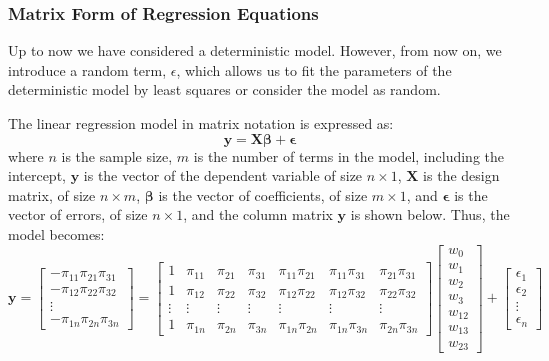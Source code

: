 \documentclass[
	11pt, %
	fleqn, %
	a4paper, %
]{LegrandOrangeBook}
\begin{document}
\subsubsection{Matrix Form of Regression Equations}
Up to now we have considered a deterministic model. However, from now on, we introduce a random term, $\epsilon$, which allows us to fit the parameters of the deterministic model by least squares or consider the model as random.

The linear regression model in matrix notation is expressed as:
\begin{equation}
\mathbf{y} = \mathbf{X}\boldsymbol{\beta} + \boldsymbol{\epsilon}
\label{eq:matrixregression}
\end{equation}
where $n$ is the sample size, $m$ is the number of terms in the model, including the intercept, $\mathbf{y}$ is the vector of the dependent variable of size $n \times 1$, $\mathbf{X}$ is the design matrix, of size $n \times m$, $\boldsymbol{\beta}$ is the vector of coefficients, of size $m \times 1$, and $\boldsymbol{\epsilon}$ is the vector of errors, of size $n \times 1$, and the column matrix $\mathbf{y}$ is shown below.
Thus, the model becomes:
\begin{equation}
\mathbf{y} = \begin{bmatrix}
-\pi_{11}\pi_{21}\pi_{31} \\
-\pi_{12}\pi_{22}\pi_{32} \\
\vdots \\
-\pi_{1n}\pi_{2n}\pi_{3n}
\end{bmatrix} =
\begin{bmatrix}
1 & \pi_{11} & \pi_{21} & \pi_{31} & \pi_{11}\pi_{21} & \pi_{11}\pi_{31} & \pi_{21}\pi_{31} \\
1 & \pi_{12} & \pi_{22} & \pi_{32} & \pi_{12}\pi_{22} & \pi_{12}\pi_{32} & \pi_{22}\pi_{32} \\
\vdots & \vdots & \vdots & \vdots & \vdots & \vdots & \vdots \\
1 & \pi_{1n} & \pi_{2n} & \pi_{3n} & \pi_{1n}\pi_{2n} & \pi_{1n}\pi_{3n} & \pi_{2n}\pi_{3n}
\end{bmatrix}
\begin{bmatrix}
w_0 \\
w_1 \\
w_2 \\
w_3 \\
w_{12} \\
w_{13} \\
w_{23}
\end{bmatrix} +
\begin{bmatrix}
\epsilon_1 \\
\epsilon_2 \\
\vdots \\
\epsilon_n
\end{bmatrix}
\label{eq:fullmatrix}
\end{equation}
\end{document}
